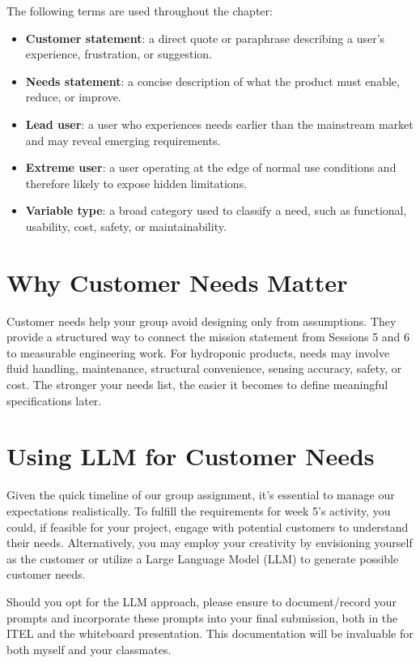 The following terms are used throughout the chapter:
\begin{itemize}
    \item \textbf{Customer statement}: a direct quote or paraphrase describing a user's experience, frustration, or suggestion.
    \item \textbf{Needs statement}: a concise description of what the product must enable, reduce, or improve.
    \item \textbf{Lead user}: a user who experiences needs earlier than the mainstream market and may reveal emerging requirements.
    \item \textbf{Extreme user}: a user operating at the edge of normal use conditions and therefore likely to expose hidden limitations.
    \item \textbf{Variable type}: a broad category used to classify a need, such as functional, usability, cost, safety, or maintainability.
\end{itemize}

\section{Why Customer Needs Matter}

Customer needs help your group avoid designing only from assumptions. They provide a structured way to connect the mission statement from Sessions 5 and 6 to measurable engineering work. For hydroponic products, needs may involve fluid handling, maintenance, structural convenience, sensing accuracy, safety, or cost. The stronger your needs list, the easier it becomes to define meaningful specifications later.

\section{Using LLM for Customer Needs}

Given the quick timeline of our group assignment, it's essential to manage our expectations realistically. To fulfill the requirements for week 5's activity, you could, if feasible for your project, engage with potential customers to understand their needs. Alternatively, you may employ your creativity by envisioning yourself as the customer or utilize a Large Language Model (LLM) to generate possible customer needs. 


Should you opt for the LLM approach, please ensure to document/record your prompts and incorporate these prompts into your final submission, both in the ITEL and the whiteboard presentation. This documentation will be invaluable for both myself and your classmates.


